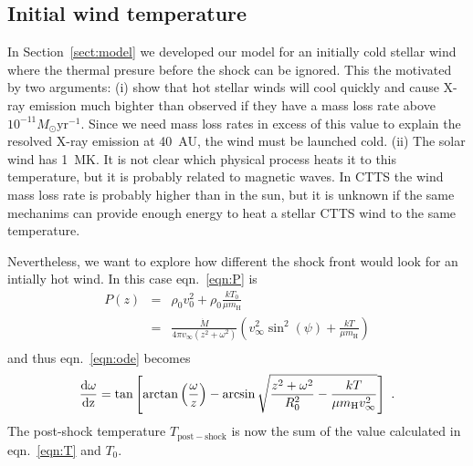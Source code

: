 \subsection{Initial wind temperature}
\label{sect:T_0}
In Section~\ref{sect:model} we developed our model for an initially cold stellar wind where the thermal presure before the shock can be ignored. This the motivated by two arguments: (i) \citet{2007IAUS..243..299M} show that hot stellar winds will cool quickly and cause X-ray emission much bighter than observed if they have a mass loss rate above $10^{-11}M_\odot\mathrm{ yr}^{-1}$. Since we need mass loss rates in excess of this value to explain the resolved X-ray emission at 40~AU, the wind must be launched cold. (ii) The solar wind has 1~MK. It is not clear which physical process heats it to this temperature, but it is probably related to magnetic waves. In CTTS the wind mass loss rate is probably higher than in the sun, but it is unknown if the same mechanims can provide enough energy to heat a stellar CTTS wind to the same temperature.

Nevertheless, we want to explore how different the shock front would look for an intially hot wind.
In this case eqn.~\ref{eqn:P} is
\begin{eqnarray}
P(z) & = & \rho_0 v_0^2 + \rho_0 \frac{k T_0}{\mu m_{\textrm{H}}} \nonumber\\ 
     & = & \frac{\dot{M}}{4\pi v_{\infty}(z^2+\omega^2)} \left( v_{\infty}^2 \sin^2(\psi) + \frac{kT}{\mu m_{\textrm{H}}}\right)\\
\end{eqnarray}
and thus eqn.~\ref{eqn:ode} becomes
\begin{equation}
\frac{\rm{d}\omega}{\rm{d}z} = \tan\left[\arctan\left(\frac{\omega}{z}\right)-\arcsin\sqrt{\frac{z^2+\omega^2}{R_0^2}-\frac{kT}{\mu m_{\textrm{H}} v_{\infty}^2}}\right]\ .
\end{equation}
The post-shock temperature $T_{\mathrm{post-shock}}$ is now the sum of the value calculated in eqn.~\ref{eqn:T} and $T_0$.

